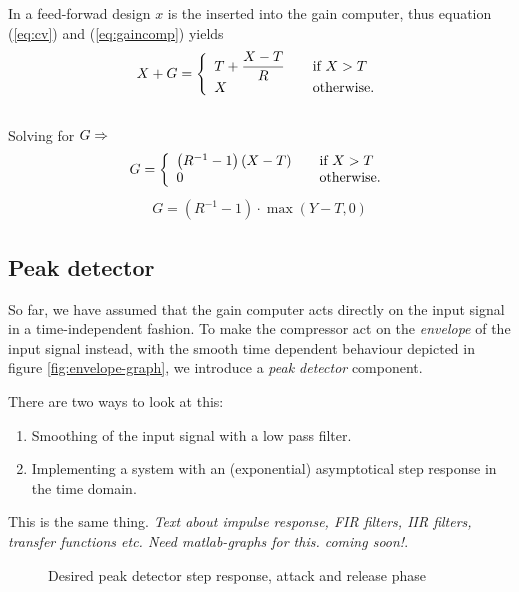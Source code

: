 \documentclass[]{article}
\begin{document}
In a feed-forwad design $x$ is the inserted into the gain computer, thus equation (\ref{eq:cv}) and (\ref{eq:gaincomp}) yields
\begin{equation}
X+G = \left\{ 
  \begin{array}{l l}
    T+ \dfrac{X-T}{R} & \quad \text{if $X > T$}\\
    X & \quad \text{otherwise.}
  \end{array} \right.
\end{equation}
\\Solving for $G \rm \Rightarrow$
\begin{equation} \label{eq:c}
G = \left\{ 
  \begin{array}{l l}
    \left(R^{-1}-1\right)(X-T)& \quad \text{if $X > T$}\\
    0 & \quad \text{otherwise.}
  \end{array} \right.
\end{equation}
\begin{align}
G = (R^{-1}-1)\cdot \max\left(Y-T,0\right)
\end{align}

\subsection{Peak detector}
So far, we have assumed that the gain computer acts directly on the input signal in a time-independent fashion. To make the compressor act on the \emph{envelope} of the input signal instead, with the smooth time dependent behaviour depicted in figure \ref{fig:envelope-graph}, we introduce a \emph{peak detector} component.

There are two ways to look at this:
\begin{enumerate}
\item Smoothing of the input signal with a low pass filter.
\item Implementing a system with an (exponential) asymptotical step response in the time domain.
\end{enumerate}

This is the same thing. \emph{Text about impulse response, FIR filters, IIR filters, transfer functions etc. Need matlab-graphs for this. coming soon!}.

\begin{figure}[ht]
\centering

\caption{Desired peak detector step response, attack and release phase} 
\label{fig:attack-release-graph}
\end{figure}
\end{document}

